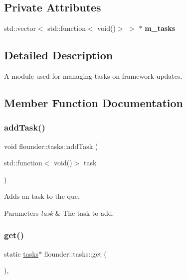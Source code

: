 \subsection*{Private Attributes}
\begin{DoxyCompactItemize}
\item 
\mbox{\label{classflounder_1_1tasks_a124cfcd550de91ef1285a41f6bb2c5ff}} 
std\+::vector$<$ std\+::function$<$ void()$>$ $>$ $\ast$ {\bfseries m\+\_\+tasks}
\end{DoxyCompactItemize}


\subsection{Detailed Description}
A module used for managing tasks on framework updates. 



\subsection{Member Function Documentation}
\mbox{\label{classflounder_1_1tasks_a4c162853b207b90c2686ce0eb9dc9265}} 
\subsubsection{\texorpdfstring{add\+Task()}{addTask()}}
{\footnotesize\ttfamily void flounder\+::tasks\+::add\+Task (\begin{DoxyParamCaption}\item[{std\+::function$<$ void()$>$}]{task }\end{DoxyParamCaption})}



Adds an task to the que. 


\begin{DoxyParams}{Parameters}
{\em task} & The task to add. \\
\hline
\end{DoxyParams}
\mbox{\label{classflounder_1_1tasks_a24877315f9d4a52671f5d62ea40d83ec}} 
\subsubsection{\texorpdfstring{get()}{get()}}
{\footnotesize\ttfamily static \hyperlink{classflounder_1_1tasks}{tasks}$\ast$ flounder\+::tasks\+::get (\begin{DoxyParamCaption}{ }\end{DoxyParamCaption})\hspace{0.3cm}{\ttfamily [inline]}, {\ttfamily [static]}}



